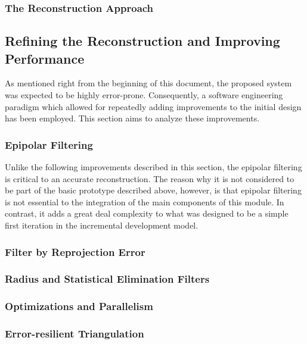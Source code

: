 \documentclass[12pt,a4paper,twoside,openright]{report}
\begin{document}
\subsubsection{}
\subsubsection{The Reconstruction Approach}

\subsection{Refining the Reconstruction and Improving Performance}
As mentioned right from the beginning of this document, the proposed system was expected to be highly error-prone. Consequently, a software engineering paradigm which allowed for repeatedly adding improvements to the initial design has been employed. This section aims to analyze these improvements.
\subsubsection{Epipolar Filtering}
Unlike the following improvements described in this section, the epipolar filtering is critical to an accurate reconstruction. The reason why it is not considered to be part of the basic prototype described above, however, is that epipolar filtering is not essential to the integration of the main components of this module. In contrast, it adds a great deal complexity to what was designed to be a simple first iteration in the incremental development model.\\
\newline
	

\subsubsection{Filter by Reprojection Error}
\subsubsection{Radius and Statistical Elimination Filters}
\subsubsection{Optimizations and Parallelism}
\subsubsection{Error-resilient Triangulation}
\end{document}
